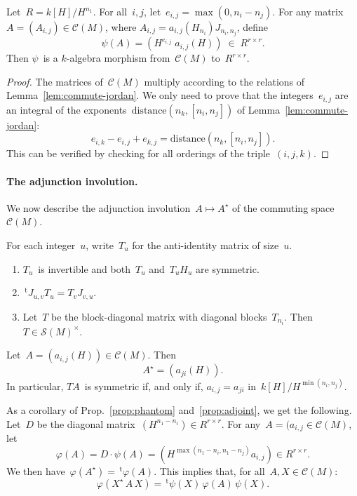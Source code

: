 \documentclass{lms}%
\let\ro\mathscr
\def\transpose{\,{}^{\mathrm{t}\!}}
\begin{document}
\begin{prop}\label{prop:phantom}%
Let~$R = k[H]/H^{n_1}$. For all~$i, j$, let~$e_{i,j} = \max (0, n_i -
n_j)$. For any matrix~$A = (A_{i,j}) ∈ \ro C(M)$, where $A_{i,j} =
a_{i,j}(H_{n_i}) J_{n_i, n_j}$, define
\begin{equation}
ψ(A) = (H^{e_{i,j}}\; a_{i,j}(H)) \; ∈ \; R^{r×r}.
\end{equation}
Then $ψ$~is a $k$-algebra morphism from~$\ro C(M)$ to~$R^{r×r}$.
\end{prop}

\begin{proof}
The matrices of~$\ro C(M)$ multiply according to the relations of
Lemma~\ref{lem:commute-jordan}. We only need to prove that the
integers~$e_{i,j}$ are an integral of the exponents~$\mathrm{distance}
(n_k, [n_i, n_j])$ of Lemma~\ref{lem:commute-jordan}:
\begin{equation}\label{eq:integral}
e_{i,k} - e_{i,j} + e_{k,j} = \mathrm{distance} (n_k, [n_i, n_j]).
\end{equation}
This can be verified by checking for all orderings of the
triple~$(i,j,k)$.
\end{proof}%

\paragraph{The adjunction involution.}
We now describe the adjunction involution~$A ↦ A^{⋆}$ of the commuting
space~$\ro C(M)$.

\begin{prop}\label{prop:big-T}%
For each integer~$u$, write~$T_u$ for the anti-identity matrix of
size~$u$.
\begin{enumerate}
\item $T_u$~is invertible and both~$T_u$ and~$T_u H_u$ are symmetric.
\item $\transpose{J_{u,v}} T_u = T_v J_{v,u}$.
\item Let~$T$ be the block-diagonal matrix with diagonal
blocks~$T_{n_i}$. Then $T ∈ \ro S(M)^{×}$.
\end{enumerate}
\end{prop}
\begin{prop}\label{prop:adjoint}%
Let~$A = (a_{i,j}(H)) ∈ \ro C(M)$. Then \[ A^{⋆} = (a_{ji}(H)). \]
In particular, $TA$~is symmetric if, and only if, $a_{i,j} = a_{ji}$
in~$k[H]/H^{\min (n_i, n_j)}$.
\end{prop}

As a corollary of Prop.~\ref{prop:phantom} and~\ref{prop:adjoint}, we get
the following. Let~$D$ be the diagonal matrix~$(H^{n_1-n_i}) ∈ R^{r×r}$.
For any~$A = (a_{i,j}∈ \ro C(M)$, let
\begin{equation}
φ(A) = D · ψ(A) = (H^{\max (n_1-n_i,n_1-n_j)}a_{i,j}) ∈ R^{r×r}.
\end{equation}
We then have~$φ(A^{⋆}) = \transpose{φ(A)}$. This implies that, for
all~$A, X ∈ \ro C(M)$:
\begin{equation}\label{eq:phi-psi}
φ(X^{⋆}\,A\,X) = \transpose{ψ(X)}\, φ(A)\, ψ(X).
\end{equation}
\end{document}

